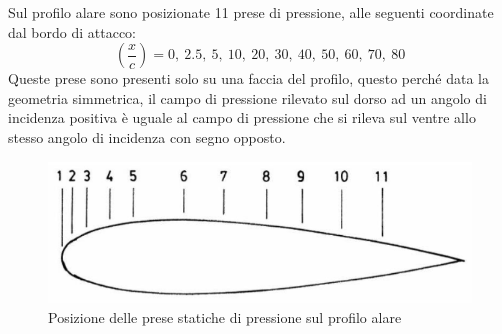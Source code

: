 \noindent Sul profilo alare sono posizionate 11 prese di pressione, alle seguenti coordinate dal bordo di attacco:
\begin{equation*}
    \left( \frac xc \right) = 0,\ 2.5,\ 5,\ 10,\ 20,\ 30,\ 40,\ 50,\ 60,\ 70,\ 80
\end{equation*}
Queste prese sono presenti solo su una faccia del profilo, questo perché data la geometria simmetrica, il campo di pressione rilevato sul dorso ad un angolo di incidenza positiva è uguale al campo di pressione che si rileva sul ventre allo stesso angolo di incidenza con segno opposto.
\begin{figure}[h]
    \centering
    \includegraphics[width=.8\textwidth]{images/5/posizioneprese.png}
    \caption{Posizione delle prese statiche di pressione sul profilo alare}
\end{figure}

